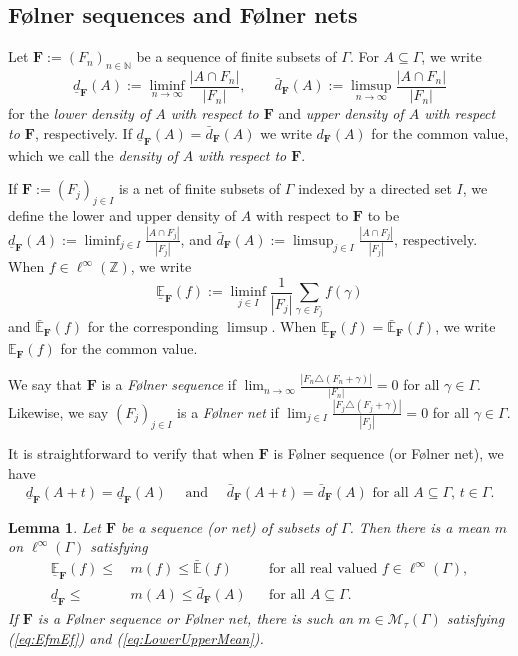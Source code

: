\documentclass[12pt]{amsart} \usepackage{amsmath,centernot,amssymb,leftindex}
\newcommand{\mb}{\mathbf}
\newtheorem{lemma}[theorem]{Lemma}
\numberwithin{theorem}{section}
\numberwithin{equation}{section}
\theoremstyle{definition}
\begin{document}
	\subsection{F{\o}lner sequences and F{\o}lner nets}
	
	Let $\mathbf F:=(F_n)_{n\in \mathbb N}$ be a sequence of finite subsets of $\Gamma$.  For $A\subseteq \Gamma$, we write
	\[
	\underline{d}_{\mb F}(A):= \liminf_{n\to\infty}\frac{|A\cap F_n|}{|F_n|}, \qquad 	\bar{d}_{\mb F}(A):= \limsup_{n\to\infty}\frac{|A\cap F_n|}{|F_n|}
	\]
	for the \emph{lower density of $A$ with respect to $\mb F$} and \emph{upper density of $A$ with respect to $\mb F$}, respectively.  
	 If $\underline{d}_{\mb F}(A)=\bar{d}_{\mb F}(A)$ we write $d_{\mb F}(A)$ for the common value, which we call the \emph{density of $A$ with respect to $\mathbf F$}.
	
	If $\mathbf F:=(F_j)_{j\in I}$ is a net of finite subsets of $\Gamma$ indexed by a directed set $I$, we define the lower and upper density of $A$ with respect to $\mathbf F$ to be $\underline{d}_{\mb F}(A):=\liminf_{j\in I} \frac{|A\cap F_j|}{|F_j|}$, and $\bar{d}_{\mb F}(A):=\limsup_{j\in I} \frac{|A\cap F_j|}{|F_j|}$, respectively.  When $f\in \ell^{\infty}(\mathbb Z)$, we write
	\[
	\underline{\mathbb E}_{\mb F}(f):=\liminf_{j\in I} \frac{1}{|F_{j}|}\sum_{\gamma\in F_{j}}f(\gamma)
	\]
	and $\bar{\mathbb E}_{\mb F}(f)$ for the corresponding $\limsup$.  When $\underline{\mathbb E}_{\mb F}(f)=\bar{\mathbb E}_{\mb F}(f)$, we write $\mathbb E_{\mb F}(f)$  for the common value.
	
	We say that $\mb F$ is a \emph{F{\o}lner sequence} if $\lim_{n\to\infty} \frac{|F_n\triangle (F_n+\gamma)|}{|F_n|}=0$ for all $\gamma\in \Gamma$.  Likewise, we say $(F_j)_{j\in I}$ is a \emph{F{\o}lner net} if $\lim_{j\in I} \frac{|F_j\triangle (F_j+\gamma)|}{|F_j|}=0$ for all $\gamma\in \Gamma$.  
	
	It is straightforward to verify that when $\mb F$ is F{\o}lner sequence (or F{\o}lner net), we have 
\begin{equation}\label{eq:FolnerTransInv}
	\underline{d}_{\mb F}(A+t)=\underline{d}_{\mb F}(A) \quad \text{ and }\quad  \bar{d}_{\mb F}(A+t)=\bar{d}_{\mb F}(A) \text{ for all } A\subseteq \Gamma,\, t\in \Gamma.
\end{equation}
	
	\begin{lemma}\label{lem:MeanFromSequence}
		Let $\mb F$ be a sequence (or net) of subsets of $\Gamma$.  Then there is a mean $m$ on $\ell^\infty(\Gamma)$ satisfying
		\begin{align}\label{eq:EfmEf}
			\underline{\mathbb E}_{\mb F}(f)\leq &\,m(f)\leq \bar{\mathbb E}(f) && \text{for all real valued } f\in \ell^{\infty}(\Gamma),\\
	\label{eq:LowerUpperMean}
			\underline{d}_{\mb F}\leq & \,m(A)\leq \bar{d}_{\mb F}(A) && \text{for all } A\subseteq \Gamma.
		\end{align}  If $\mb F$ is a F{\o}lner sequence or F{\o}lner net,  there is such an $m\in \mathcal M_{\tau}(\Gamma)$ satisfying (\ref{eq:EfmEf}) and (\ref{eq:LowerUpperMean}).
	\end{lemma}
	
\end{document}
